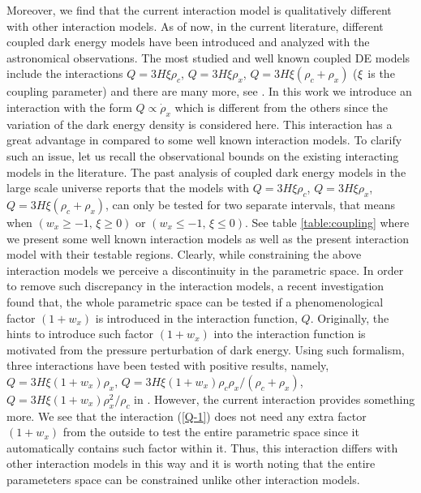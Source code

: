 \documentclass[superscriptaddress,oneolumn,secnumarabic,
amssymb,amsmath,nobibnotes,aps,prd,showpacs,nofootinbib]{revtex4}%
\begin{document}
Moreover, we find that the current interaction model is qualitatively different with other interaction models. As of now, in the current literature, different coupled dark energy models have been introduced and analyzed with the astronomical observations. The most studied and well known coupled DE models include the interactions $Q = 3 H \xi \rho_c$, $Q = 3H \xi \rho_x$, $Q = 3 H \xi (\rho_c +\rho_x)$ ($\protect \xi$ is the coupling parameter) and there are many more, see \cite{Billyard:2000bh, Olivares:2005tb,delCampo:2008jx,Amendola, Koivisto, delCampo:2008sr,Chimento:2009hj, Quartin:2008px, Valiviita:2009nu, Clemson:2011an, Pan:2013rha, Yang:2014hea, Faraoni:2014vra, Yang:2014gza, Nunes:2014qoa, yang:2014vza,thor,barrow, amendola, llinares, Pan:2014afa, Chen:2011cy, Tamanini:2015iia, Pan:2012ki, Duniya:2015nva, Valiviita:2015dfa, Yang:2016evp, Pan:2016ngu, Mukherjee:2016shl, Sola:2016ecz, Sharov:2017iue,Cai:2017yww, Santos:2017bqm, Mifsud:2017fsy, Salvatelli:2014zta, Nunes:2016dlj,Kumar:2016zpg,vandeBruck:2016hpz, Yang:2017yme, Kumar:2017dnp}. In this work we introduce an interaction with the form $Q \propto \dot{\rho}_x$ which is different from the others since the variation of the dark energy density is considered here. 
This interaction has a great advantage in compared to some well known interaction models. To clarify such an issue, let us recall the observational
bounds on the existing interacting models in the literature.
The past analysis of coupled dark energy models in the large scale universe reports that the models with $Q = 3 H \xi \rho_c$, $Q = 3H \xi \rho_x$, $Q = 3 H \xi (\rho_c +\rho_x)$, can only be tested for two separate intervals, that means when $(w_x \geq -1,\, \xi \geq 0)$ or $(w_x \leq -1,\, \xi \leq 0)$.  See table \ref{table:coupling} where we present some well known interaction models as well as the present interaction model with their testable regions. Clearly, while constraining the above interaction models we perceive a discontinuity in the parametric space. In order to remove such discrepancy in the interaction models, a recent investigation \cite{ypb} found that, the whole parametric space can be tested if a phenomenological factor $(1+w_x)$ is introduced in  the interaction function, $Q$. Originally, the hints to introduce such factor $(1+w_x)$ into the interaction function is motivated from the pressure perturbation of dark energy. Using such formalism, three interactions have been tested with positive results, namely, $Q= 3 H \xi (1+w_x)\rho_x$, $Q = 3 H \xi (1+w_x) \rho_c \rho_x/(\rho_c+\rho_x)$, $Q=  3 H \xi (1+w_x) \rho_x^2/\rho_c$ in \cite{ypb}. However, the current interaction provides something more.  We see that the interaction (\ref{Q-1}) does not need any extra factor $(1+w_x)$ from the outside to test the entire parametric space since it automatically contains such factor within it. Thus, this interaction differs with other interaction models in this way and it is worth noting that the entire parameteters space can be constrained unlike other interaction models.
\end{document}

